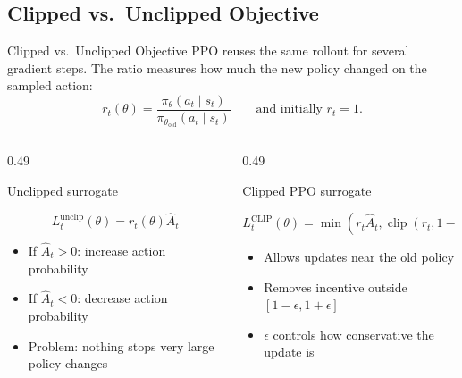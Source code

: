 \documentclass[aspectratio=169, 11pt]{beamer}
\begin{document}
\subsection{Clipped vs.\ Unclipped Objective}
\begin{frame}{Clipped vs.\ Unclipped Objective}
  \small
  PPO reuses the same rollout for several gradient steps. The ratio measures how
  much the new policy changed on the sampled action:
  \[
    r_t(\theta)=\frac{\pi_\theta(a_t\mid s_t)}{\pi_{\theta_{\mathrm{old}}}(a_t\mid s_t)}
    \qquad \text{and initially } r_t=1.
  \]

  \vspace{-0.3em}
  \begin{columns}[T]
    \begin{column}{0.49\textwidth}
      \begin{block}{Unclipped surrogate}
        \begin{minipage}[c][1.55cm][c]{\textwidth}
          \[
            L_t^{\mathrm{unclip}}(\theta)=r_t(\theta)\hat{A}_t
          \]
        \end{minipage}
      \end{block}
      \begin{itemize}
        \item If $\hat{A}_t>0$: increase action probability
        \item If $\hat{A}_t<0$: decrease action probability
        \item Problem: nothing stops very large policy changes
      \end{itemize}
    \end{column}
    \begin{column}{0.49\textwidth}
      \begin{block}{Clipped PPO surrogate}
        \begin{minipage}[c][1.55cm][c]{\textwidth}
          \[
            L_t^{\mathrm{CLIP}}(\theta)=
            \min\!\left(
              r_t\hat{A}_t,
              \operatorname{clip}(r_t,1-\epsilon,1+\epsilon)\hat{A}_t
            \right)
          \]
        \end{minipage}
      \end{block}
      \begin{itemize}
        \item Allows updates near the old policy
        \item Removes incentive outside $[1-\epsilon,1+\epsilon]$
        \item $\epsilon$ controls how conservative the update is
      \end{itemize}
    \end{column}
  \end{columns}


\end{frame}
\end{document}
